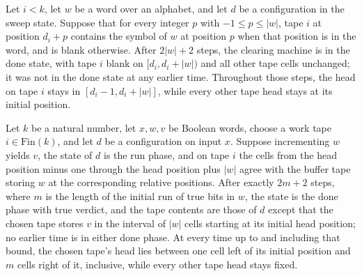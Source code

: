 \begin{theorem}
\label{Turing.clearTM_run_ofCfg}
\leanok
{}
Let $i<k$, let $w$ be a word over an alphabet, and let $d$ be a configuration in the
sweep state. Suppose that for every integer $p$ with $-1\le p\le |w|$, tape $i$ at
position $d_i+p$ contains the symbol of $w$ at position $p$ when that position is in the
word, and is blank otherwise. After $2|w|+2$ steps, the clearing machine is in the done
state, with tape $i$ blank on $[d_i,d_i+|w|)$ and all other tape cells unchanged; it was
not in the done state at any earlier time. Throughout those steps, the head on tape $i$
stays in $[d_i-1,d_i+|w|]$, while every other tape head stays at its initial position.
\end{theorem}

\begin{theorem}
\label{Turing.incrementTM_run_succ_ofCfg}
\leanok
{}
Let $k$ be a natural number, let $x,w,v$ be Boolean words, choose a work tape
$i\in\mathrm{Fin}(k)$, and let $d$ be a configuration on input $x$. Suppose incrementing
$w$ yields $v$, the state of $d$ is the run phase, and on tape $i$ the cells from the
head position minus one through the head position plus $|w|$ agree with the buffer tape
storing $w$ at the corresponding relative positions. After exactly $2m+2$ steps, where
$m$ is the length of the initial run of true bits in $w$, the state is the done phase
with true verdict, and the tape contents are those of $d$ except that the chosen tape
stores $v$ in the interval of $|w|$ cells starting at its initial head position; no
earlier time is in either done phase. At every time up to and including that bound, the
chosen tape's head lies between one cell left of its initial position and $m$ cells
right of it, inclusive, while every other tape head stays fixed.
\end{theorem}

